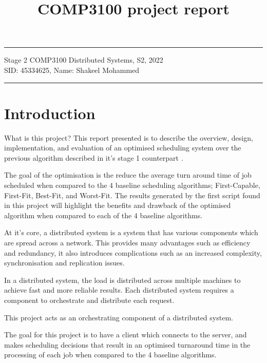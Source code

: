 \documentclass[a4paper]{article}
\begin{document}
\title{COMP3100 project report}
\hrule \medskip
\begin{minipage}{0.9\textwidth}
\centering 
\large
Stage 2 COMP3100 Distributed Systems, S2, 2022\\
\normalsize
SID: 45334625, Name: Shakeel Mohammed
\end{minipage}
\medskip\hrule
\bigskip

\section{Introduction}
What is this project?
This report presented is to describe the overview, design, implementation, and evaluation of an optimised scheduling system over the previous algorithm described in it's stage 1 counterpart \cite{s1-report}. 

The goal of the optimisation is the reduce the average turn around time of job scheduled when compared to the 4 baseline scheduling algorithms; First-Capable, First-Fit, Best-Fit, and Worst-Fit. The results generated by the first script found in this project will highlight the benefits and drawback of the optimised algorithm when compared to each of the 4 baseline algorithms.

At it's core, a distributed system is a system that has various components which are spread across a network. This provides many advantages such as efficiency and redundancy, it also introduces complications such as an increased complexity, synchronisation and replication issues.

In a distributed system, the load is distributed across multiple machines to achieve fast and more reliable results. Each distributed system requires a component to orchestrate and distribute each request.

This project acts as an orchestrating component of a distributed system.

The goal for this project is to have a client which connects to the server, and makes scheduling decisions that result in an optimised turnaround time in the processing of each job when compared to the 4 baseline algorithms.
\end{document}
